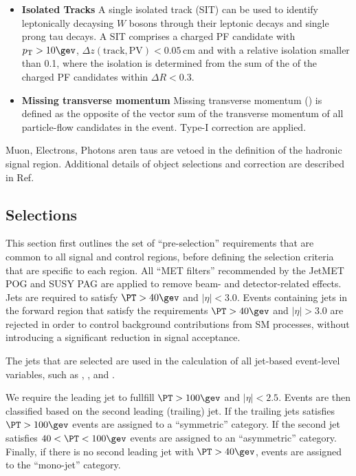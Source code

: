 \begin{itemize}
  \item{\bf Isolated Tracks}  A single isolated track (SIT) can be used to identify leptonically decaysing $W$ bosons through their leptonic decays and single prong tau decays.
    A SIT comprises a charged PF candidate with $\Pt > 10 \gev$, $\Delta z(\mathrm{track}, \mathrm{PV}) < 0.05 \, \mathrm{cm}$  and with a relative isolation smaller than 0.1, where the isolation is determined from the sum of the \Pt of the charged PF candidates within $\Delta R < 0.3$.

 \item{\bf Missing transverse momentum} Missing transverse momentum (\met) is defined as the opposite of the vector sum of the transverse momentum of all particle-flow candidates in the event. Type-I \met correction \cite{Khachatryan:2014gga} are applied.


\end{itemize}


Muon, Electrons, Photons aren taus are vetoed in the definition of the hadronic signal region. Additional details of object selections and correction are described in Ref.~\cite{alphaTnote}

\subsection{Selections}


This section first outlines the set of ``pre-selection'' requirements that are common to all signal and control regions, before defining the
selection criteria that are specific to each region. 
All ``MET filters'' recommended by the JetMET POG and SUSY PAG are applied to remove beam- and detector-related effects. 
Jets are required to satisfy $\PT>40\gev$ and $|\eta|<3.0$. Events containing jets in the forward region that
satisfy the requirements $\PT>40\gev$ and $|\eta|>3.0$ are rejected in order to control background contributions from SM processes, without
introducing a significant reduction in signal acceptance. 

The jets that are selected are used in the calculation of all jet-based event-level variables, such as \HT, \mht, and \alphat.

We require the leading jet to fullfill $\PT > 100\gev$ and $|\eta|<2.5$.  Events are then classified based on the second leading (trailing) jet. 
If the trailing jets satisfies $\PT > 100\gev$  events are assigned to a ``symmetric'' \njet category. If the second
jet satisfies $40 < \PT < 100\gev$ events are assigned to an ``asymmetric'' \njet category. Finally, if there is no second leading
jet with $\PT>40\gev$, events are assigned to the ``mono-jet'' category. 

